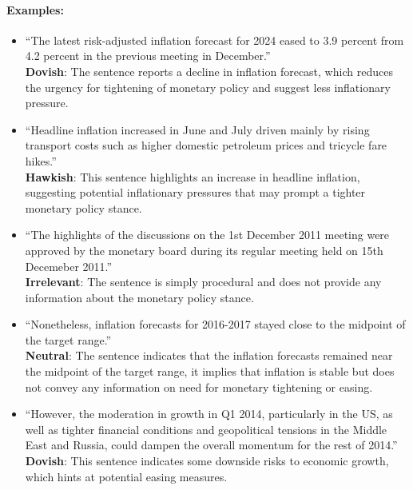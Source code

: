 \paragraph{Examples:}
\begin{itemize}
    \item ``The latest risk-adjusted inflation forecast for 2024 eased to 3.9 percent from 4.2 percent in the previous meeting in December.''\\ 
    \textbf{Dovish}: The sentence reports a decline in inflation forecast, which reduces the urgency for tightening of monetary policy and suggest less inflationary pressure.

    \item ``Headline inflation increased in June and July driven mainly by rising transport costs such as higher domestic petroleum prices and tricycle fare hikes.''\\ 
    \textbf{Hawkish}: This sentence highlights an increase in headline inflation, suggesting potential inflationary pressures that may prompt a tighter monetary policy stance.
    
    \item ``The highlights of the discussions on the 1st December 2011 meeting were approved by the monetary board during its regular meeting held on 15th Decemeber 2011.''\\ 
    \textbf{Irrelevant}: The sentence is simply procedural and does not provide any information about the monetary policy stance.
    
    \item ``Nonetheless, inflation forecasts for 2016-2017 stayed close to the midpoint of the target range.''\\ 
    \textbf{Neutral}: The sentence indicates that the inflation forecasts remained near the midpoint of the target range, it implies that inflation is stable but does not convey any information on need for monetary tightening or easing. 
    
    \item ``However, the moderation in growth in Q1 2014, particularly in the US, as well as tighter financial conditions and geopolitical tensions in the Middle East and Russia, could dampen the overall momentum for the rest of 2014.''\\ 
    \textbf{Dovish}: This sentence indicates some downside risks to economic growth, which hints at potential easing measures.
\end{itemize}






